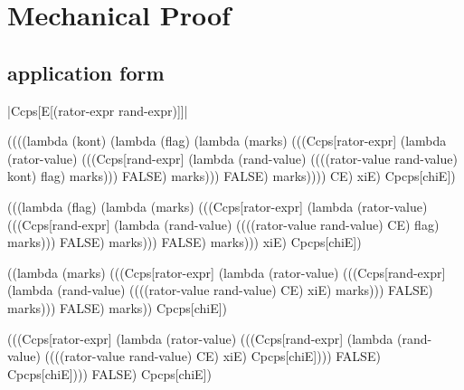 \appendix
\chapter{Mechanical Proof}

\section{application form}

\noindent
\scheme|Ccps[E[(rator-expr rand-expr)]]|
\begin{schemeblock}
\begin{schemedisplay}
((((lambda (kont)
     (lambda (flag)
       (lambda (marks)
         (((Ccps[rator-expr]
                (lambda (rator-value)
                  (((Ccps[rand-expr]
                         (lambda (rand-value)
                           ((((rator-value rand-value) kont) flag) marks)))
                    FALSE) marks)))
           FALSE) marks))))
   CE) xiE) Cpcps[chiE])
\end{schemedisplay}
\end{schemeblock}

\begin{schemeblock}
\begin{schemedisplay}
(((lambda (flag)
    (lambda (marks)
      (((Ccps[rator-expr]
             (lambda (rator-value)
               (((Ccps[rand-expr]
                      (lambda (rand-value)
                        ((((rator-value rand-value) CE) flag) marks)))
                 FALSE) marks)))
        FALSE) marks)))
  xiE) Cpcps[chiE])
\end{schemedisplay}
\end{schemeblock}

\begin{schemeblock}
\begin{schemedisplay}
((lambda (marks)
   (((Ccps[rator-expr]
          (lambda (rator-value)
            (((Ccps[rand-expr]
                   (lambda (rand-value)
                     ((((rator-value rand-value) CE) xiE) marks)))
              FALSE) marks)))
     FALSE) marks)) Cpcps[chiE])
\end{schemedisplay}
\end{schemeblock}

\begin{schemeblock}
\begin{schemedisplay}
(((Ccps[rator-expr]
       (lambda (rator-value)
         (((Ccps[rand-expr]
                (lambda (rand-value)
                  ((((rator-value rand-value) CE) xiE) Cpcps[chiE])))
           FALSE) Cpcps[chiE])))
  FALSE) Cpcps[chiE])
\end{schemedisplay}
\end{schemeblock}

